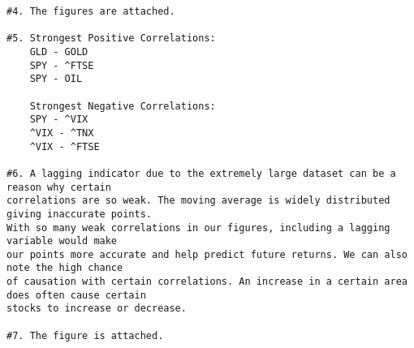 \documentclass[12pt]{article}
\begin{document}
\begin{lstlisting}
#4. The figures are attached.

#5. Strongest Positive Correlations:
	GLD - GOLD
	SPY - ^FTSE
	SPY - OIL

	Strongest Negative Correlations:
	SPY - ^VIX
    ^VIX - ^TNX
    ^VIX - ^FTSE

#6. A lagging indicator due to the extremely large dataset can be a reason why certain
correlations are so weak. The moving average is widely distributed giving inaccurate points.
With so many weak correlations in our figures, including a lagging variable would make 
our points more accurate and help predict future returns. We can also note the high chance
of causation with certain correlations. An increase in a certain area does often cause certain
stocks to increase or decrease.

#7. The figure is attached. 
\end{lstlisting}
\end{document}
